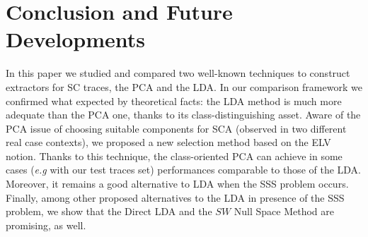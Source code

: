 \section{Conclusion and Future Developments}\label{sec:conclusions}

In this paper we studied and compared two well-known techniques to construct extractors for SC traces, the PCA and the LDA. In our comparison framework we confirmed what expected by theoretical facts: the LDA method is much more adequate than the PCA one, thanks to its class-distinguishing asset. Aware of the PCA issue of choosing suitable components for SCA (observed in two different real case contexts), we proposed a new selection method based on the ELV notion. Thanks to this technique, the class-oriented PCA can achieve in some cases ({\em e.g} with our test traces set) performances comparable to those of the LDA. Moreover, it remains a good alternative to LDA when the SSS problem occurs. Finally, among other proposed alternatives to the LDA in presence of the SSS problem, we show that the Direct LDA and the $SW$ Null Space Method are promising, as well.

